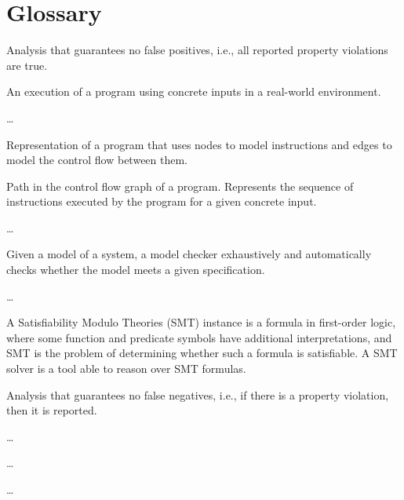 
\section{Glossary}
\label{se:glossary}

 Analysis that guarantees no false positives, i.e., all reported property violations are true.

\smallskip{} An execution of a program using concrete inputs in a real-world environment.

\smallskip{} \ldots

\smallskip{} Representation of a program that uses nodes to model instructions and edges to model the control flow between them.

\smallskip{} Path in the control flow graph of a program. Represents the sequence of instructions executed by the program for a given concrete input.

\smallskip{} \ldots

\smallskip{} Given a model of a system, a model checker exhaustively and automatically checks whether the model meets a given specification.

\smallskip{} \ldots

\smallskip{} A Satisfiability Modulo Theories (SMT) instance is a formula in first-order logic, where some function and predicate symbols have additional interpretations, and SMT is the problem of determining whether such a formula is satisfiable. A SMT solver is a tool able to reason over SMT formulas.

\smallskip{} Analysis that guarantees no false negatives, i.e., if there is a property violation, then it is reported.

\smallskip{} \ldots

\smallskip{} \ldots

\smallskip{} \ldots
